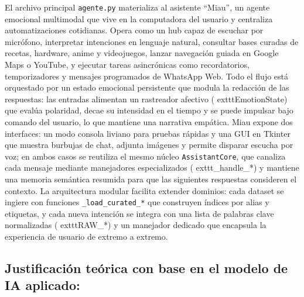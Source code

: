 \documentclass[letterpaper,12pt]{article}
\begin{document}
El archivo principal \texttt{agente.py} materializa al asistente ``Miau'', un agente emocional multimodal que vive en la computadora del usuario y centraliza automatizaciones cotidianas. Opera como un hub capaz de escuchar por micr\'ofono, interpretar intenciones en lenguaje natural, consultar bases curadas de recetas, hardware, anime y videojuegos, lanzar navegaci\'on guiada en Google Maps o YouTube, y ejecutar tareas asincr\'onicas como recordatorios, temporizadores y mensajes programados de WhatsApp Web. Todo el flujo est\'a orquestado por un estado emocional persistente que modula la redacci\'on de las respuestas: las entradas alimentan un rastreador afectivo (	exttt{EmotionState}) que eval\'ua polaridad, decae su intensidad en el tiempo y se puede impulsar bajo comando del usuario, lo que mantiene una narrativa emp\'atica. Miau expone dos interfaces: un modo consola liviano para pruebas r\'apidas y una GUI en Tkinter que muestra burbujas de chat, adjunta im\'agenes y permite disparar escucha por voz; en ambos casos se reutiliza el mesmo n\'ucleo \texttt{AssistantCore}, que canaliza cada mensaje mediante manejadores especializados (	exttt{\_handle\_*}) y mantiene una memoria sem\'antica resumida para que las siguientes respuestas consideren el contexto. La arquitectura modular facilita extender dominios: cada dataset se ingiere con funciones \texttt{\_load\_curated\_*} que construyen \'indices por alias y etiquetas, y cada nueva intenci\'on se integra con una lista de palabras clave normalizadas (	exttt{RAW\_*}) y un manejador dedicado que encapsula la experiencia de usuario de extremo a extremo. 


\subsection{Justificación teórica con base en el modelo de IA aplicado:}
\end{document}
